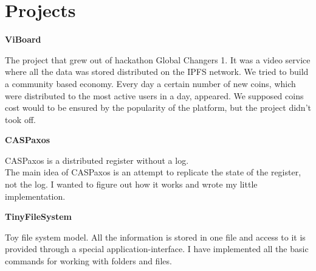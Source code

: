 \documentclass[fontsize=11pt]{article}
\newcommand{\NewPart}[1]{\section*{#1}}
\newcommand{\ProgrammingEntry}[2]{
    \noindent \textbf{#1} \hfill      %

    \noindent \small #2 %
    \normalsize \par}
\begin{document}
\NewPart{Projects}{}
\ProgrammingEntry
{ViBoard}
{The project that grew out of hackathon Global Changers 1. It was a video service where all the data was stored distributed on the IPFS network. We tried to build a community based economy. Every day  a certain number of new coins, which were distributed to the most active users in a day, appeared. We supposed coins cost would to be ensured by the popularity of the platform, but the project didn't took off.}
\bigskip
\ProgrammingEntry
{CASPaxos}
{CASPaxos is a distributed register without a log. \\ The main idea of CASPaxos is an attempt to replicate the state of the register, not the log. I wanted to figure out how it works and wrote my little implementation.}
\bigskip
\ProgrammingEntry
{TinyFileSystem}
{Toy file system model. All the information is stored in one file and access to it is provided through a special application-interface. I have implemented all the basic commands for working with folders and files.}
\end{document}
